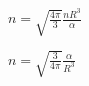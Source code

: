\documentclass{article}
\begin{document}
$ n = \sqrt{ \frac{4 \pi}{3} } \frac{ nR^3}{\alpha} $
\pagebreak

$ n = \sqrt{ \frac{3}{4 \pi} } \frac{ \alpha }{ R^3} $
\pagebreak
\end{document}
